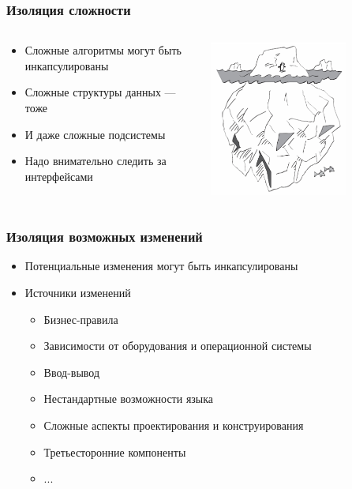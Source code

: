 \documentclass[xetex,mathserif,serif]{beamer}
\begin{document}
	\begin{frame}
		\frametitle{Изоляция сложности}
		\begin{columns}
			\begin{column}{0.6\textwidth}
				\begin{itemize}
					\item Сложные алгоритмы могут быть инкапсулированы
					\item Сложные структуры данных --- тоже
					\item И даже сложные подсистемы
					\item Надо внимательно следить за интерфейсами
				\end{itemize}
			\end{column}
			\begin{column}{0.4\textwidth}
				\includegraphics[width=0.7\textwidth]{complexity.png}
			\end{column}
		\end{columns}
	\end{frame}

	\begin{frame}
		\frametitle{Изоляция возможных изменений}
		\begin{itemize}
			\item Потенциальные изменения могут быть инкапсулированы
			\item Источники изменений
			\begin{itemize}
				\item Бизнес-правила
				\item Зависимости от оборудования и операционной системы
				\item Ввод-вывод
				\item Нестандартные возможности языка
				\item Сложные аспекты проектирования и конструирования
				\item Третьесторонние компоненты
				\item ...
			\end{itemize}
		\end{itemize}
	\end{frame}
\end{document}
